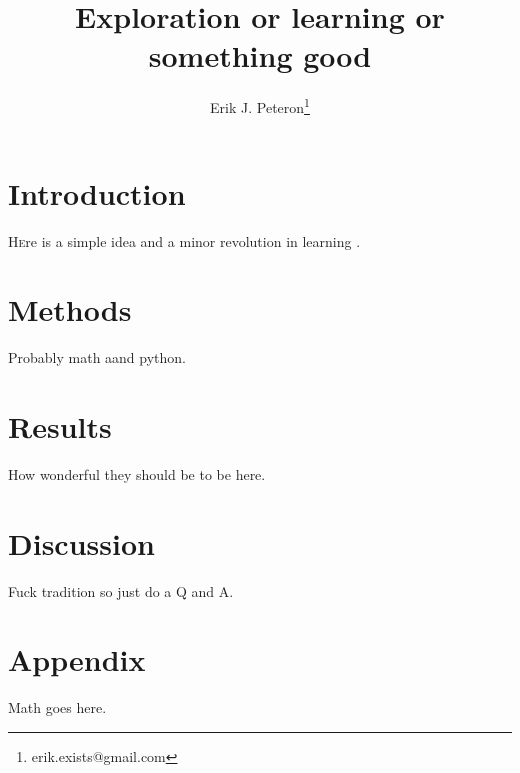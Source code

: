 \documentclass[twoside,twocolumn]{article}
\title{Exploration or learning or something good} %
\author[1]{Erik J. Peteron\thanks{erik.exists@gmail.com}}
\affil[1]{Department of Psychology, Carnegie Mellon University}
\date{} %
\begin{document}
\maketitle
\section{Introduction}

\lettrine[nindent=0em,lines=3]{H} ere is a simple idea and a minor revolution in learning \cite{Wolpert1997a}. 


\section{Methods}
Probably math aand python.


\section{Results}
How wonderful they should be to be here.


\section{Discussion}
Fuck tradition so just do a Q and A.

\medskip
{
\small


}

\section{Appendix}
Math goes here.

\end{document}
